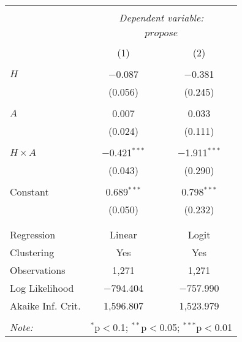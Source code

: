 
\begin{tabular}{@{\extracolsep{5pt}}lcc} 
\\[-1.8ex]\hline 
\hline \\[-1.8ex] 
 & \multicolumn{2}{c}{\textit{Dependent variable:}} \\ 
\cline{2-3} 
\\[-1.8ex] & \multicolumn{2}{c}{$propose$} \\ 
\\[-1.8ex] & (1) & (2)\\ 
\hline \\[-1.8ex] 
 $H$ & $-$0.087 & $-$0.381 \\ 
  & (0.056) & (0.245) \\ 
  & & \\ 
 $A$ & 0.007 & 0.033 \\ 
  & (0.024) & (0.111) \\ 
  & & \\ 
 $H\times A$ & $-$0.421$^{***}$ & $-$1.911$^{***}$ \\ 
  & (0.043) & (0.290) \\ 
  & & \\ 
 Constant & 0.689$^{***}$ & 0.798$^{***}$ \\ 
  & (0.050) & (0.232) \\ 
  & & \\ 
\hline \\[-1.8ex] 
Regression & Linear & Logit \\ 
Clustering & Yes & Yes \\ 
Observations & 1,271 & 1,271 \\ 
Log Likelihood & $-$794.404 & $-$757.990 \\ 
Akaike Inf. Crit. & 1,596.807 & 1,523.979 \\ 
\hline 
\hline \\[-1.8ex] 
\textit{Note:}  & \multicolumn{2}{r}{$^{*}$p$<$0.1; $^{**}$p$<$0.05; $^{***}$p$<$0.01} \\ 
\end{tabular} 
